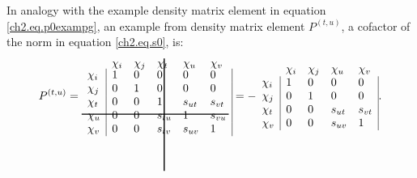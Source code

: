 In analogy with the example density matrix element in equation \ref{ch2.eq.p0exampg}, an example from density matrix element $P^{(t,u)}$, a cofactor of the norm in equation \ref{ch2.eq.s0}, is:
\begin{equation}
P^{(t,u)}=
\begin{array}{llllll}
 & \hskip 46.0 pt \hbox{\lower 93pt\hbox{\vrule height100pt width 1.0pt}}\hskip-47.0pt \chi_i & \chi_j & \chi_t & \chi_u & \chi_v \\
 \noalign{\vskip-91pt}
 \chi_i &  \multicolumn{1}{|l}{ 1 } & 0 & 0 & 0 & \multicolumn{1}{l|}{ 0 } \\
 \chi_j & \multicolumn{1}{|l}{ 0 } & 1 & 0 & 0 & \multicolumn{1}{l|}{ 0 } \\
 \chi_t & \multicolumn{1}{|l}{ 0 } & 0 & 1 & s_{ut} & \multicolumn{1}{l|}{s_{vt}} \\
 \chi_u & \multicolumn{1}{|l}{ 0 } & 0 & s_{tu} & 1 & \multicolumn{1}{l|}{s_{vu}} \\
 \noalign{\vskip-8pt}
 \multispan6\hbox{\vrule  height 1.0 pt width130pt}\cr
 \noalign{\vskip 7pt}
 \chi_v & \multicolumn{1}{|l}{ 0 } & 0 & s_{tv} & s_{uv} & \multicolumn{1}{l|}{ 1 }
\end{array} =
- \begin{array}{lllll}
 &  \chi_i & \chi_j & \chi_u & \chi_v \\
 \chi_i & \multicolumn{1}{|l}{ 1 } & 0 & 0 & \multicolumn{1}{l|}{ 0 } \\
 \chi_j & \multicolumn{1}{|l}{ 0 } & 1 & 0 & \multicolumn{1}{l|}{ 0 } \\
 \chi_t & \multicolumn{1}{|l}{ 0 } & 0 & s_{ut} & \multicolumn{1}{l|}{s_{vt}} \\
 \chi_v & \multicolumn{1}{|l}{ 0 } & 0 & s_{uv} & \multicolumn{1}{l|}{1}
\end{array}.
\label{ch2.eq.p0examp}
\end{equation}

